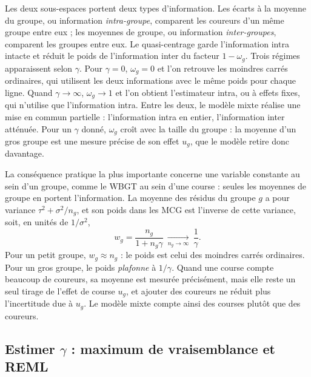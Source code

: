 \documentclass[11pt,a4paper]{article}
\begin{document}
Les deux sous-espaces portent deux types d'information. Les écarts à la moyenne du groupe, ou information
\emph{intra-groupe}, comparent les coureurs d'un même groupe entre eux ; les moyennes de groupe, ou information
\emph{inter-groupes}, comparent les groupes entre eux. Le quasi-centrage garde l'information intra intacte et réduit
le poids de l'information inter du facteur $1 - \omega_g$. Trois régimes apparaissent selon $\gamma$. Pour
$\gamma = 0$, $\omega_g = 0$ et l'on retrouve les moindres carrés ordinaires, qui utilisent les deux informations
avec le même poids pour chaque ligne. Quand $\gamma \to \infty$, $\omega_g \to 1$ et l'on obtient l'estimateur
intra, ou à effets fixes, qui n'utilise que l'information intra. Entre les deux, le modèle mixte réalise une mise en
commun partielle : l'information intra en entier, l'information inter atténuée. Pour un $\gamma$ donné, $\omega_g$
croît avec la taille du groupe : la moyenne d'un gros groupe est une mesure précise de son effet $u_g$, que le modèle
retire donc davantage.

La conséquence pratique la plus importante concerne une variable constante au sein d'un groupe, comme le WBGT au
sein d'une course : seules les moyennes de groupe en portent l'information. La moyenne des résidus du groupe $g$ a
pour variance $\tau^2 + \sigma^2/n_g$, et son poids dans les MCG est l'inverse de cette variance, soit, en unités de
$1/\sigma^2$,
\begin{equation}\label{eq:poids_groupe}
w_g = \frac{n_g}{1 + n_g\gamma} \ \xrightarrow[n_g \to \infty]{}\ \frac{1}{\gamma}.
\end{equation}
Pour un petit groupe, $w_g \approx n_g$ : le poids est celui des moindres carrés ordinaires. Pour un gros groupe, le
poids \emph{plafonne} à $1/\gamma$. Quand une course compte beaucoup de coureurs, sa moyenne est mesurée précisément,
mais elle reste un seul tirage de l'effet de course $u_g$, et ajouter des coureurs ne réduit plus l'incertitude due à
$u_g$. Le modèle mixte compte ainsi des courses plutôt que des coureurs.

\subsection{Estimer \texorpdfstring{$\gamma$}{gamma} : maximum de vraisemblance et REML}\label{sec:reml}
\end{document}
